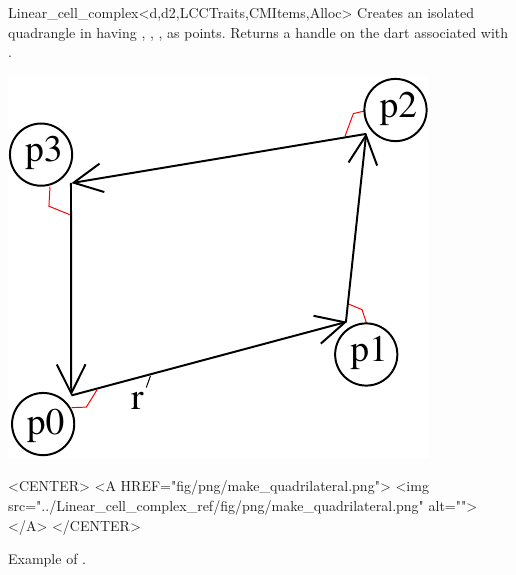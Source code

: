 \begin{ccRefClass}{Linear_cell_complex<d,d2,LCCTraits,CMItems,Alloc>}
{Creates an isolated quadrangle in   having , , 
  ,  as points.
   Returns a handle on the dart associated with .
}
%
\def\LargFig{.3\textwidth}
  \begin{ccTexOnly}
    \begin{center}
      \includegraphics[width=\LargFig]{Linear_cell_complex_ref/fig/pdf/make_quadrilateral}
    \end{center}
  \end{ccTexOnly}
  \begin{ccHtmlOnly}
    <CENTER>
    <A HREF="fig/png/make_quadrilateral.png">
        <img src="../Linear_cell_complex_ref/fig/png/make_quadrilateral.png" alt=""></A>
    </CENTER>
    \end{ccHtmlOnly}
    \centerline{Example of .}


\end{ccRefClass}
